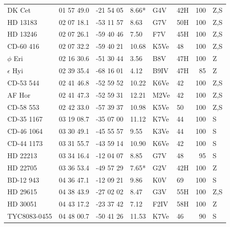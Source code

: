 \documentclass[11pt,twoside]{book}
\begin{document}
\begin{table}[]
{\begin{tabular}{lcclllrl}
DK Cet       &01 57 49.0&    -21 54 05 &     \hspace{2mm}8.66* &      G4V &42H&100&Z,S\\
HD 13183    &02 07 18.1&    -53 11 57&      \hspace{2mm}8.63 &      G7V  &50H&100&Z,S\\
HD 13246    &02 07 26.1&     -59 40 46&      \hspace{2mm}7.50 &      F7V &45H&100&Z,S\\
CD-60 416    &02 07 32.2&    -59 40 21&       10.68 &      K5Ve  &48&100&Z,S\\
$\phi$ Eri   &02 16 30.6&    -51 30 44&      \hspace{2mm}3.56&      B8V  &47H&100&Z\\
$\epsilon$ Hyi&02 39 35.4&   -68 16 01&      \hspace{2mm}4.12&      B9IV &47H&85&Z\\
CD-53 544    &02 41 46.8&    -52 59 52&       10.22 &      K6Ve  &42&100&Z,S\\
AF Hor       &02 41 47.3&    -52 59 31 &      12.21 &      M2Ve  &42&100&Z,S\\
CD-58 553    &02 42 33.0&    -57 39 37&       10.98 &      K5Ve   &50&100&Z,S\\
CD-35 1167   &03 19 08.7&    -35 07 00&       11.12  &         K7Ve  &44&100&S\\
CD-46 1064   &03 30 49.1&    -45 55 57 &     \hspace{2mm}9.55  &         K3Ve &44&100&S\\
CD-44 1173   &03 31 55.7&    -43 59 14&       10.90 &      K6Ve  &42&100&S\\
HD 22213     &03 34 16.4&    -12 04 07&      \hspace{2mm}8.85  &G7V&48&95&S\\
HD 22705     &03 36 53.4&    -49 57 29   &   \hspace{2mm}7.65* &      G2V    &42H&100&Z\\
BD-12 943    &04 36 47.1&    -12 09 21&  \hspace{2mm}9.86 &    K0V&  69&100&S\\
HD 29615     &04 38 43.9&    -27 02 02 &     \hspace{2mm}8.47 &      G3V  &55H&100&Z,S\\
HD 30051     &04 43 17.2&    -23 37 42   &   \hspace{2mm}7.12 &     F2IV &58H&100&Z\\
TYC8083-0455   &04 48 00.7&    -50 41 26&       11.53 &      K7Ve   &46&90&S\\

\end{tabular}}
\end{table}
\end{document}
